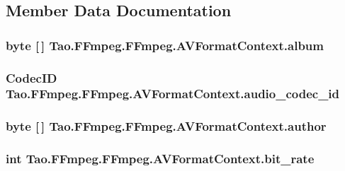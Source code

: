 \subsection{Member Data Documentation}
\hypertarget{struct_tao_1_1_f_fmpeg_1_1_f_fmpeg_1_1_a_v_format_context_a6f0050a2309c6a3855629b7794c6bb31}{
\subsubsection[{album}]{\setlength{\rightskip}{0pt plus 5cm}byte \mbox{[}$\,$\mbox{]} {\bf Tao.FFmpeg.FFmpeg.AVFormatContext.album}}}
\label{struct_tao_1_1_f_fmpeg_1_1_f_fmpeg_1_1_a_v_format_context_a6f0050a2309c6a3855629b7794c6bb31}
\hypertarget{struct_tao_1_1_f_fmpeg_1_1_f_fmpeg_1_1_a_v_format_context_a17defb4e5d6295e5a07a10b237a8687f}{
\subsubsection[{audio\_\-codec\_\-id}]{\setlength{\rightskip}{0pt plus 5cm}CodecID {\bf Tao.FFmpeg.FFmpeg.AVFormatContext.audio\_\-codec\_\-id}}}
\label{struct_tao_1_1_f_fmpeg_1_1_f_fmpeg_1_1_a_v_format_context_a17defb4e5d6295e5a07a10b237a8687f}
\hypertarget{struct_tao_1_1_f_fmpeg_1_1_f_fmpeg_1_1_a_v_format_context_a3e48cbde311d11cddf8477f52559d776}{
\subsubsection[{author}]{\setlength{\rightskip}{0pt plus 5cm}byte \mbox{[}$\,$\mbox{]} {\bf Tao.FFmpeg.FFmpeg.AVFormatContext.author}}}
\label{struct_tao_1_1_f_fmpeg_1_1_f_fmpeg_1_1_a_v_format_context_a3e48cbde311d11cddf8477f52559d776}
\hypertarget{struct_tao_1_1_f_fmpeg_1_1_f_fmpeg_1_1_a_v_format_context_a0c333f23a29c14a32a7642a1027d1d38}{
\subsubsection[{bit\_\-rate}]{\setlength{\rightskip}{0pt plus 5cm}int {\bf Tao.FFmpeg.FFmpeg.AVFormatContext.bit\_\-rate}}}
